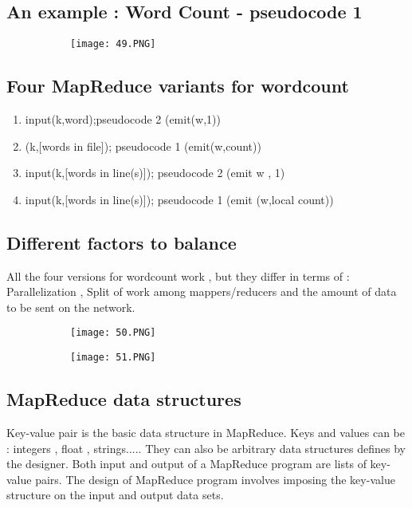 \documentclass{article}
\begin{document}
\subsection{An example : Word Count - pseudocode 1}

\begin{figure}[ht!]
  \centering
  \begin{subfigure}[b]{0.5\linewidth}
    \texttt{[image: 49.PNG]}
  \end{subfigure}
\end{figure}
\subsection{Four MapReduce variants for wordcount}

\begin{enumerate}
    \item input(k,word);pseudocode 2 (emit(w,1))
    \item (k,[words in file]); pseudocode 1 (emit(w,count))
    \item input(k,[words in line(s)]); pseudocode 2 (emit w , 1)
    \item input(k,[words in line(s)]); pseudocode 1 (emit (w,local count))
\end{enumerate}

\subsection{Different factors to balance}

All the four versions for wordcount work , but they differ in terms of : Parallelization , Split of work among mappers/reducers and the amount of data to be sent on the network.

\begin{figure}[ht!]
  \centering
  \begin{subfigure}[b]{0.5\linewidth}
    \texttt{[image: 50.PNG]}
  \end{subfigure}
     \begin{subfigure}[b]{0.4\textwidth}
         \centering
         \texttt{[image: 51.PNG]}
     \end{subfigure}
\end{figure}

\subsection{MapReduce data structures }
Key-value pair is the basic data structure in MapReduce.
Keys and values can be  : integers , float , strings.....
They can also be arbitrary data structures defines by the designer.
Both input and output of a MapReduce program are lists of key-value pairs.
The design of MapReduce program involves imposing the key-value structure on the input and output data sets.
\end{document}
